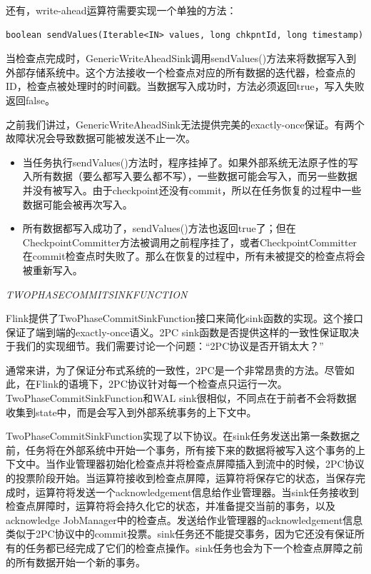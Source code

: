 \documentclass[cn,11pt,chinese]{elegantbook}
\begin{document}
还有，write-ahead运算符需要实现一个单独的方法：

\begin{verbatim}
boolean sendValues(Iterable<IN> values, long chkpntId, long timestamp)
\end{verbatim}

当检查点完成时，GenericWriteAheadSink调用sendValues()方法来将数据写入到外部存储系统中。这个方法接收一个检查点对应的所有数据的迭代器，检查点的ID，检查点被处理时的时间戳。当数据写入成功时，方法必须返回true，写入失败返回false。

之前我们讲过，GenericWriteAheadSink无法提供完美的exactly-once保证。有两个故障状况会导致数据可能被发送不止一次。

\begin{itemize}
    \item 当任务执行sendValues()方法时，程序挂掉了。如果外部系统无法原子性的写入所有数据（要么都写入要么都不写），一些数据可能会写入，而另一些数据并没有被写入。由于checkpoint还没有commit，所以在任务恢复的过程中一些数据可能会被再次写入。
    \item 所有数据都写入成功了，sendValues()方法也返回true了；但在CheckpointCommitter方法被调用之前程序挂了，或者CheckpointCommitter在commit检查点时失败了。那么在恢复的过程中，所有未被提交的检查点将会被重新写入。
\end{itemize}

\textit{TWOPHASECOMMITSINKFUNCTION}

Flink提供了TwoPhaseCommitSinkFunction接口来简化sink函数的实现。这个接口保证了端到端的exactly-once语义。2PC sink函数是否提供这样的一致性保证取决于我们的实现细节。我们需要讨论一个问题：“2PC协议是否开销太大？”

通常来讲，为了保证分布式系统的一致性，2PC是一个非常昂贵的方法。尽管如此，在Flink的语境下，2PC协议针对每一个检查点只运行一次。TwoPhaseCommitSinkFunction和WAL sink很相似，不同点在于前者不会将数据收集到state中，而是会写入到外部系统事务的上下文中。

TwoPhaseCommitSinkFunction实现了以下协议。在sink任务发送出第一条数据之前，任务将在外部系统中开始一个事务，所有接下来的数据将被写入这个事务的上下文中。当作业管理器初始化检查点并将检查点屏障插入到流中的时候，2PC协议的投票阶段开始。当运算符接收到检查点屏障，运算符将保存它的状态，当保存完成时，运算符将发送一个acknowledgement信息给作业管理器。当sink任务接收到检查点屏障时，运算符将会持久化它的状态，并准备提交当前的事务，以及acknowledge JobManager中的检查点。发送给作业管理器的acknowledgement信息类似于2PC协议中的commit投票。sink任务还不能提交事务，因为它还没有保证所有的任务都已经完成了它们的检查点操作。sink任务也会为下一个检查点屏障之前的所有数据开始一个新的事务。
\end{document}
